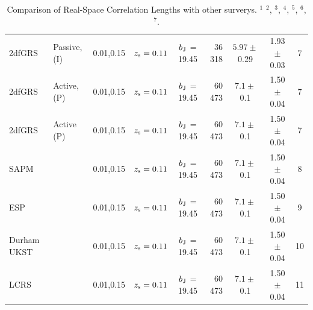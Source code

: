 \documentclass[usenatbib]{mn2e}
\begin{document}
\begin{table}
\begin{center}
\begin{tabular}{llcccrccc}
2dfGRS   & Passive, (I) &0.01,0.15  & $z_{\rm s}= 0.11$  & $b_{\rm J}$ = 19.45            &   36 318 & $5.97\pm$0.29         & 1.93$\pm$0.03  &     7     \\
2dfGRS    & Active, (P)  &0.01,0.15  & $z_{\rm s}= 0.11$  & $b_{\rm J}$ = 19.45            &   60 473 & $7.1 \pm$0.1          & 1.50$\pm$0.04  &      7    \\
2dfGRS   & Active  (P)  &0.01,0.15  & $z_{\rm s}= 0.11$  & $b_{\rm J}$ = 19.45            &   60 473 & $7.1 \pm$0.1          & 1.50$\pm$0.04  &       7   \\
\hline
SAPM          & &0.01,0.15  & $z_{\rm s}= 0.11$  & $b_{\rm J}$ = 19.45            &   60 473 & $7.1 \pm$0.1          & 1.50$\pm$0.04 &         8  \\
\hline
ESP           & &0.01,0.15  & $z_{\rm s}= 0.11$  & $b_{\rm J}$ = 19.45            &   60 473 & $7.1 \pm$0.1          & 1.50$\pm$0.04 &         9 \\
\hline
Durham UKST   & &0.01,0.15  & $z_{\rm s}= 0.11$  & $b_{\rm J}$ = 19.45            &   60 473 & $7.1 \pm$0.1          & 1.50$\pm$0.04 &         10  \\
\hline
LCRS          & &0.01,0.15  & $z_{\rm s}= 0.11$  & $b_{\rm J}$ = 19.45            &   60 473 & $7.1 \pm$0.1          & 1.50$\pm$0.04 &         11  \\
\hline
\hline
\end{tabular}
\caption[Comparison of Real-Space Correlation Lengths with other surverys.]
{Comparison of Real-Space Correlation Lengths with other surverys.
  $^1$\citet{Ross07}
  $^2$\citet{Zehavi05a}, 
  $^3$\citet[][Table 1]{Zehavi05b}, 
  $^4$\citet{Pollo04},
  $^5$\citet{Coil04}, 
  $^6$\citet{Hawkins03}, 
  $^7$\citet{Madgwick03}. 
}
\label{tab:r_nought_comp}

\end{center}
\end{table}
\end{document}
